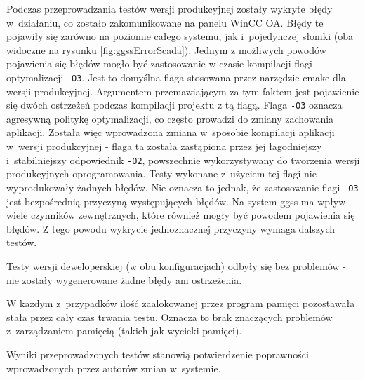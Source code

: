 Podczas przeprowadzania testów wersji produkcyjnej zostały wykryte błędy w~działaniu, co zostało zakomunikowane na panelu WinCC OA. Błędy te pojawiły się zarówno na poziomie całego systemu, jak i~pojedynczej słomki (oba widoczne na rysunku \ref{fig:ggssErrorScada}). Jednym z możliwych powodów pojawienia się błędów mogło być zastosowanie w czasie kompilacji flagi optymalizacji \lstinline{-O3}. Jest to domyślna flaga stosowana przez narzędzie \gls*{cmake} dla wersji produkcyjnej. Argumentem przemawiającym za tym faktem jest pojawienie się dwóch ostrzeżeń podczas kompilacji projektu z tą flagą. Flaga \lstinline{-O3} oznacza agresywną politykę optymalizacji, co często prowadzi do zmiany zachowania aplikacji. Została więc wprowadzona zmiana w~sposobie kompilacji aplikacji w~wersji produkcyjnej - flaga ta została zastąpiona przez jej łagodniejszy i~stabilniejszy odpowiednik \lstinline{-O2}, powszechnie wykorzystywany do tworzenia wersji produkcyjnych oprogramowania. Testy wykonane z~użyciem tej flagi nie wyprodukowały żadnych błędów. Nie oznacza to jednak, że zastosowanie flagi \lstinline{-O3} jest bezpośrednią przyczyną występujących błędów. Na system \gls*{ggss} ma wpływ wiele czynników zewnętrznych, które również mogły być powodem pojawienia się błędów. Z tego powodu wykrycie jednoznacznej przyczyny wymaga dalszych testów.

Testy wersji deweloperskiej (w obu konfiguracjach) odbyły się bez problemów - nie zostały wygenerowane żadne błędy ani ostrzeżenia. 

W każdym z~przypadków ilość zaalokowanej przez program pamięci pozostawała stała przez cały czas trwania testu. Oznacza to brak znaczących problemów z~zarządzaniem pamięcią (takich jak wycieki pamięci).

Wyniki przeprowadzonych testów stanowią potwierdzenie poprawności wprowadzonych przez autorów zmian w~systemie. 

